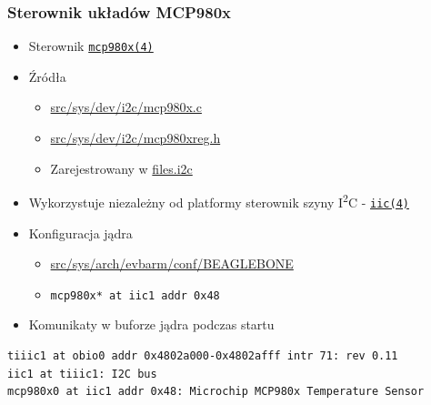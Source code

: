 \documentclass[dvipsnames,table]{beamer}
\begin{document}
\begin{frame}[fragile]
\frametitle{Sterownik układów MCP980x}
\begin{itemize}
	\item Sterownik {\tt\href{http://netbsd.gw.com/cgi-bin/man-cgi?mcp980x+4+NetBSD-current}{mcp980x(4)}}
	\item Źródła
	\begin{itemize}
		\item \href{http://nxr.netbsd.org/xref/src/sys/dev/i2c/mcp980x.c}{src/sys/dev/i2c/mcp980x.c}
		\item \href{http://nxr.netbsd.org/xref/src/sys/dev/i2c/mcp980xreg.h}{src/sys/dev/i2c/mcp980xreg.h}
		\item Zarejestrowany w \href{http://nxr.netbsd.org/xref/src/sys/dev/i2c/files.i2c}{files.i2c}
	\end{itemize}
	\item Wykorzystuje niezależny od platformy sterownik szyny I\textsuperscript{2}C - {\tt\href{http://netbsd.gw.com/cgi-bin/man-cgi?iic+9+NetBSD-current}{iic(4)}}
	\item Konfiguracja jądra
	\begin{itemize}
		\item \href{http://nxr.netbsd.org/xref/src/sys/arch/evbarm/conf/BEAGLEBONE}{src/sys/arch/evbarm/conf/BEAGLEBONE}
		\item {\tt mcp980x* at iic1 addr 0x48}
	\end{itemize}
	\item Komunikaty w buforze jądra podczas startu
\end{itemize}
\scriptsize
\begin{verbatim}
tiiic1 at obio0 addr 0x4802a000-0x4802afff intr 71: rev 0.11
iic1 at tiiic1: I2C bus
mcp980x0 at iic1 addr 0x48: Microchip MCP980x Temperature Sensor
\end{verbatim}
\end{frame}
\end{document}
